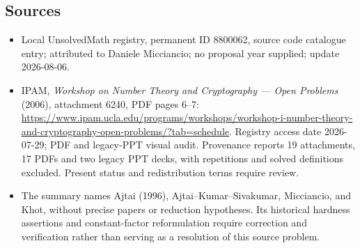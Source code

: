 \documentclass[11pt]{article}
\begin{document}
\subsection{Sources}
\begin{itemize}
\item Local UnsolvedMath registry, permanent ID 8800062, source code catalogue entry; attributed to Daniele Micciancio; no proposal year supplied; update 2026-08-06.
\item IPAM, \emph{Workshop on Number Theory and Cryptography --- Open Problems} (2006), attachment 6240, PDF pages 6--7: \url{https://www.ipam.ucla.edu/programs/workshops/workshop-i-number-theory-and-cryptography-open-problems/?tab=schedule}. Registry access date 2026-07-29; PDF and legacy-PPT visual audit. Provenance reports 19 attachments, 17 PDFs and two legacy PPT decks, with repetitions and solved definitions excluded. Present status and redistribution terms require review.
\item The summary names Ajtai (1996), Ajtai--Kumar--Sivakumar, Micciancio, and Khot, without precise papers or reduction hypotheses. Its historical hardness assertions and constant-factor reformulation require correction and verification rather than serving as a resolution of this source problem.
\end{itemize}
\end{document}
